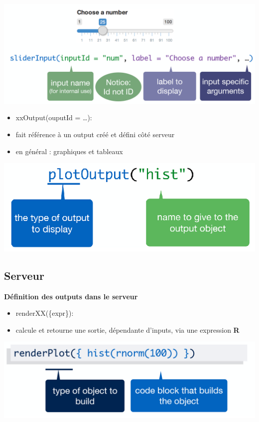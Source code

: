 \documentclass[
]{article}
\begin{document}
\includegraphics{img/xxInput.png}

\begin{itemize}
\item
  xxOutput(ouputId = \ldots):
\item
  fait référence à un output créé et défini côté serveur
\item
  en général : graphiques et tableaux
\end{itemize}

\includegraphics{img/xxOutput.png}

\hypertarget{serveur}{%
\subsection{Serveur}\label{serveur}}

\textbf{Définition des outputs dans le serveur}

\begin{itemize}
\item
  renderXX(\{expr\}):
\item
  calcule et retourne une sortie, dépendante d'inputs, via une
  expression \textbf{R}
\end{itemize}

\includegraphics{img/renderXX.png}
\end{document}
